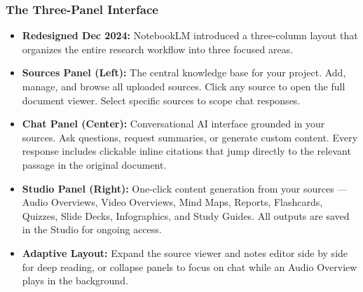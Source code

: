 \begin{frame}[fragile]\frametitle{The Three-Panel Interface}
  \begin{itemize}
    \item \textbf{Redesigned Dec 2024:} NotebookLM introduced a three-column layout that organizes the entire research workflow into three focused areas.
    \item \textbf{Sources Panel (Left):} The central knowledge base for your project. Add, manage, and browse all uploaded sources. Click any source to open the full document viewer. Select specific sources to scope chat responses.
    \item \textbf{Chat Panel (Center):} Conversational AI interface grounded in your sources. Ask questions, request summaries, or generate custom content. Every response includes clickable inline citations that jump directly to the relevant passage in the original document.
    \item \textbf{Studio Panel (Right):} One-click content generation from your sources — Audio Overviews, Video Overviews, Mind Maps, Reports, Flashcards, Quizzes, Slide Decks, Infographics, and Study Guides. All outputs are saved in the Studio for ongoing access.
    \item \textbf{Adaptive Layout:} Expand the source viewer and notes editor side by side for deep reading, or collapse panels to focus on chat while an Audio Overview plays in the background.
  \end{itemize}
\end{frame}

